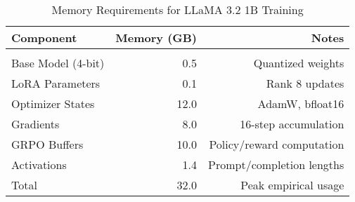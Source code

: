 \vspace*{-\baselineskip}
\vspace*{-\baselineskip}
\begin{table}[H]
  \centering
  \begin{tabular}{lrr}
    \toprule
    Component           & Memory (GB) & Notes \\
    \midrule \\
    Base Model (4-bit)  & 0.5         & Quantized weights \\
    LoRA Parameters     & 0.1         & Rank 8 updates  \\
    Optimizer States    & 12.0        & AdamW, bfloat16 \\
    Gradients           & 8.0         & 16-step accumulation \\
    GRPO Buffers        & 10.0        & Policy/reward computation \\
    Activations         & 1.4         & Prompt/completion lengths \\
    \midrule
    Total               & 32.0        & Peak empirical usage \\
    \bottomrule
  \end{tabular}
  \vspace{0.2cm}
  \caption{Memory Requirements for LLaMA 3.2 1B Training}
  \label{tab:memory_configs}
\end{table}
\vspace*{-\baselineskip}